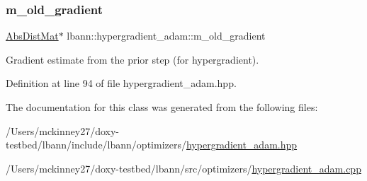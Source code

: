 \subsubsection{\texorpdfstring{m\+\_\+old\+\_\+gradient}{m\_old\_gradient}}
{\footnotesize\ttfamily \hyperlink{base_8hpp_a9a697a504ae84010e7439ffec862b470}{Abs\+Dist\+Mat}$\ast$ lbann\+::hypergradient\+\_\+adam\+::m\+\_\+old\+\_\+gradient\hspace{0.3cm}{\ttfamily [private]}}

Gradient estimate from the prior step (for hypergradient). 

Definition at line 94 of file hypergradient\+\_\+adam.\+hpp.



The documentation for this class was generated from the following files\+:\begin{DoxyCompactItemize}
\item 
/\+Users/mckinney27/doxy-\/testbed/lbann/include/lbann/optimizers/\hyperlink{hypergradient__adam_8hpp}{hypergradient\+\_\+adam.\+hpp}\item 
/\+Users/mckinney27/doxy-\/testbed/lbann/src/optimizers/\hyperlink{hypergradient__adam_8cpp}{hypergradient\+\_\+adam.\+cpp}\end{DoxyCompactItemize}
